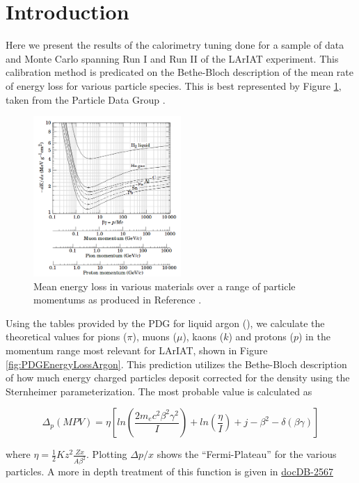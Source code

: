 \section{Introduction}\label{sec:Introduction}

Here we present the results of the calorimetry tuning done for a sample of data and Monte Carlo spanning Run I and Run II of the LArIAT experiment. This calibration method is predicated on the Bethe-Bloch description of the mean rate of energy loss for various particle species. This is best represented by Figure \ref{fig:PDGEnergyLoss}, taken from the Particle Data Group \cite{PDG}.

\begin{figure}[htb]
\centering
\includegraphics[width=0.50\textwidth]{images/PDGdEdX.png}
\caption{Mean energy loss in various materials over a range of particle momentums as produced in Reference \cite{PDG}.}
\label{fig:PDGEnergyLoss}
\end{figure}

Using the tables provided by the PDG for liquid argon (\cite{PDG-Argon}), we calculate the theoretical values for pions ($\pi$), muons ($\mu$), kaons ($k$) and protons ($p$) in the momentum range most relevant for LArIAT, shown in Figure \ref{fig:PDGEnergyLossArgon}. This prediction utilizes the Bethe-Bloch description of how much energy charged particles deposit corrected for the density using the Sternheimer parameterization. The most probable value is calculated as

\begin{equation}
\Delta_{p} (MPV) = \eta [ln (\frac{2 m_{e} c^2 \beta^{2} \gamma^{2}}{I}) + ln(\frac{\eta}{I}) + j - \beta^{2} - \delta(\beta \gamma)]
\end{equation}

where $\eta = \frac{1}{2} K z^2 \frac{Z x}{A \beta^2}$. Plotting $\Delta{p} / x$ shows the ``Fermi-Plateau'' for the various particles. A more in depth treatment of this function is given in \href{https://lartpc-docdb.fnal.gov/cgi-bin/private/RetrieveFile?docid=2567&filename=30June2017_Presentation_corrected.pdf&version=4}{docDB-2567}

